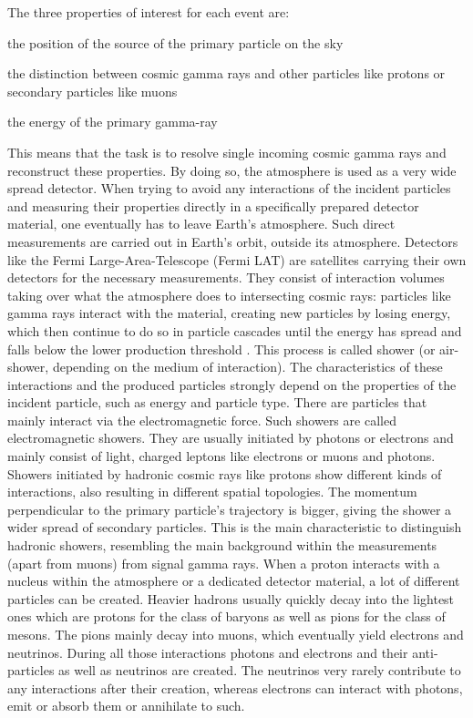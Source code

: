 The three properties of interest for each event are:
%
\begin{description}[labelsep=1em]
  \item[source position]{the position of the source of the primary particle on the sky}
  \item[particle type]{the distinction between cosmic gamma rays and other particles like protons or secondary particles like muons}
  \item[particle energy]{the energy of the primary gamma-ray}
\end{description}
%
This means that the task is to resolve single incoming cosmic gamma rays and
reconstruct these properties. By doing so, the atmosphere is used as a very
wide spread detector. When trying to avoid any interactions of the incident
particles and measuring their properties directly in a specifically prepared
detector material, one eventually has to leave Earth's atmosphere. Such direct
measurements are carried out in Earth's orbit, outside its atmosphere.
Detectors like the Fermi Large-Area-Telescope \cite{fermiLAT} (Fermi LAT) are satellites
carrying their own detectors for the necessary measurements. They consist of
interaction volumes taking over what the atmosphere does to intersecting cosmic
rays: particles like gamma rays interact with the material, creating new
particles by losing energy, which then continue to do so in particle cascades
until the energy has spread and falls below the lower production threshold \cite{aharonian}. This process is called
shower (or air-shower, depending on the medium of interaction). The
characteristics of these interactions and the produced particles strongly
depend on the properties of the incident particle, such as energy and particle
type. There are particles that mainly interact via the electromagnetic force.
Such showers are called electromagnetic showers. They are usually initiated by
photons or electrons and mainly consist of light, charged leptons like electrons or muons and photons. Showers initiated by
hadronic cosmic rays like protons show different kinds of interactions, also
resulting in different spatial topologies. The momentum perpendicular to the
primary particle's trajectory is bigger, giving the shower a wider spread of
secondary particles. This is the main characteristic to distinguish hadronic
showers, resembling the main background within the measurements (apart from
muons) from signal gamma rays. When a proton interacts with a
nucleus within the atmosphere or a dedicated detector material, a lot of
different particles can be created. Heavier hadrons usually quickly decay into
the lightest ones which are protons for the class of baryons as well as pions
for the class of mesons. The pions mainly decay into muons, which eventually
yield electrons and neutrinos. During all those interactions photons and
electrons and their anti-particles as well as neutrinos are created. The
neutrinos very rarely contribute to any interactions after their creation,
whereas electrons can interact with photons, emit or absorb them or annihilate
to such.

